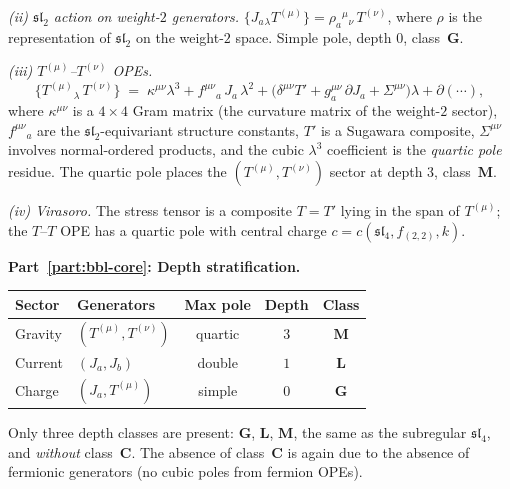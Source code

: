 \begin{computation}
\smallskip
\noindent\emph{(ii) $\mathfrak{sl}_2$ action on weight-$2$
generators.}
$\{J_a{}_\lambda T^{(\mu)}\} = \rho_a{}^{\mu}{}_\nu\,
T^{(\nu)}$,
where $\rho$ is the representation of $\mathfrak{sl}_2$
on the weight-$2$ space. Simple pole, depth $0$,
class~$\mathbf{G}$.

\smallskip
\noindent\emph{(iii) $T^{(\mu)}$--$T^{(\nu)}$ OPEs.}
\begin{equation}\label{eq:sl4rect-TT}
\{T^{(\mu)}{}_\lambda\, T^{(\nu)}\}
\;=\;
\kappa^{\mu\nu}\lambda^3
+ f^{\mu\nu}{}_a\, J_a\,\lambda^2
+ \bigl(\delta^{\mu\nu}T' + g^{\mu\nu}_a\,\partial J_a
+ \Sigma^{\mu\nu}\bigr)\lambda
+ \partial(\cdots),
\end{equation}
where $\kappa^{\mu\nu}$ is a $4\times 4$ Gram matrix
(the curvature matrix of the weight-$2$ sector),
$f^{\mu\nu}{}_a$ are the $\mathfrak{sl}_2$-equivariant
structure constants, $T'$ is a Sugawara composite,
$\Sigma^{\mu\nu}$ involves normal-ordered products, and
the cubic $\lambda^3$ coefficient is the \emph{quartic
pole} residue. The quartic pole places the
$(T^{(\mu)}, T^{(\nu)})$ sector at depth $3$,
class~$\mathbf{M}$.

\smallskip
\noindent\emph{(iv) Virasoro.}
The stress tensor is a composite $T = T'$ lying in the
span of $T^{(\mu)}$; the $T$--$T$ OPE has a quartic pole
with central charge $c = c(\mathfrak{sl}_4, f_{(2,2)}, k)$.

\medskip
\noindent\textbf{Part~\ref{part:bbl-core}: Depth stratification.}

\begin{center}
\renewcommand{\arraystretch}{1.15}
\begin{tabular}{llccc}
\textbf{Sector} & \textbf{Generators}
 & \textbf{Max pole} & \textbf{Depth}
 & \textbf{Class} \\
\hline
Gravity & $(T^{(\mu)}, T^{(\nu)})$ & quartic & $3$
 & $\mathbf{M}$ \\
Current & $(J_a, J_b)$ & double & $1$
 & $\mathbf{L}$ \\
Charge & $(J_a, T^{(\mu)})$ & simple & $0$
 & $\mathbf{G}$
\end{tabular}
\end{center}

Only three depth classes are present:
$\mathbf{G}$, $\mathbf{L}$, $\mathbf{M}$,
the same as the subregular $\mathfrak{sl}_4$, and
\emph{without} class~$\mathbf{C}$. The absence of
class~$\mathbf{C}$ is again due to the absence of
fermionic generators (no cubic poles from fermion OPEs).


\end{computation}
